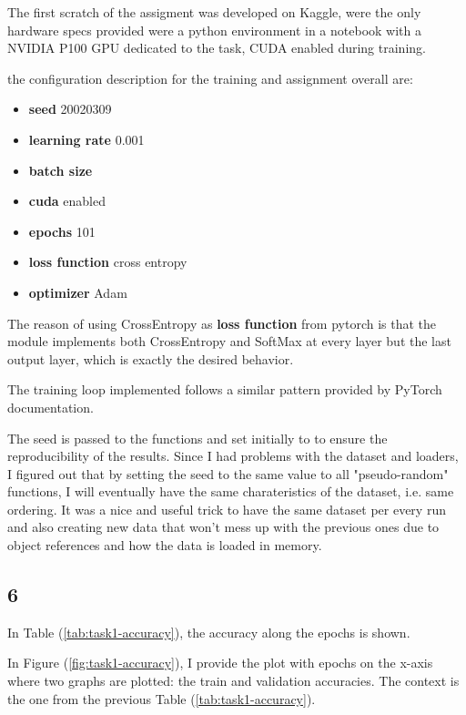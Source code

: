 \documentclass[11pt]{scrartcl}
\begin{document}
The first scratch of the assigment was developed on Kaggle, were the only hardware specs 
provided were a python environment in a notebook with a NVIDIA P100 GPU dedicated to the task,
CUDA enabled during training.

the configuration description for the training and assignment overall are:

\begin{itemize}
	\item \textbf{seed} 20020309 
	\item \textbf{learning rate} 0.001
	\item \textbf{batch size}
	\item \textbf{cuda} enabled
	\item \textbf{epochs} 101
	\item \textbf{loss function} cross entropy 
	\item \textbf{optimizer} Adam
\end{itemize}

The reason of using CrossEntropy as \textbf{loss function} from pytorch is that the 
module implements both CrossEntropy and SoftMax at every layer but the last output layer,
which is exactly the desired behavior.

The training loop implemented follows a similar pattern provided by PyTorch documentation.

The seed is passed to the functions 
and set initially to 
to ensure the reproducibility of the results.
Since I had problems with the dataset and loaders, 
I figured out that by setting the seed to the same value
to all "pseudo-random" functions,
I will eventually have the same charateristics of the dataset, 
i.e. same ordering.
It was a nice and useful trick to have the same dataset per every run
and also creating new data that won't mess up with the previous ones due to 
object references and how the data is loaded in memory.

\subsection*{6}

In Table (\ref{tab:task1-accuracy}),
the accuracy along the epochs is shown.

In Figure (\ref{fig:task1-accuracy}), 
I provide the plot with epochs on the x-axis where two graphs are plotted:
the train and validation accuracies.
The context is the one from the previous Table (\ref{tab:task1-accuracy}). 
\end{document}
